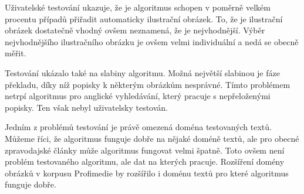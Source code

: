 Uživatelské testování ukazuje, že je algoritmus schopen v poměrně velkém procentu případů přiřadit automaticky  ilustrační obrázek. To, že je ilustrační obrázek dostatečně vhodný ovšem neznamená, že je nejvhodnější. Výběr nejvhodnějšího ilustračního obrázku je ovšem velmi individuální a nedá se obecně měřit.

Testování ukázalo také na slabiny algoritmu. Možná největší slabinou je fáze překladu, díky níž popisky k některým obrázkům nesprávné. Tímto problémem netrpí algoritmus pro anglické vyhledávání, který pracuje s nepřeloženými popisky. Ten však nebyl uživatelsky testován.

Jedním z problémů testování je právě omezená doména testovaných textů. Můžeme říci, že algoritmus funguje dobře na nějaké doméně textů, ale pro obecné zpravodajské články může algoritmus fungovat velmi špatně. Toto ovšem není problém testovaného algoritmu, ale dat na kterých pracuje. Rozšíření domény obrázků v korpusu Profimedie by rozšířilo i doménu textů pro které algoritmus funguje dobře.








